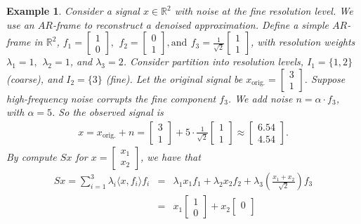 \documentclass[12pt,titlepage]{amsart}
\newtheorem{exam}[thm]{Example}
\theoremstyle{definition}
\theoremstyle{remark}
\begin{document}
\begin{exam} \label{exe.1}
Consider a signal $x \in \mathbb{R}^2$ with noise at the fine
resolution level. We use an $AR$-frame to reconstruct a denoised
approximation. Define a simple $AR$-frame in
$\mathbb{R}^2$, $f_1 = \begin{bmatrix}1 \\
0\end{bmatrix}, \,\ f_2 = \begin{bmatrix}0 \\ 1\end{bmatrix},
\mbox{and}\,\ f_3 = \frac{1}{\sqrt{2}} \begin{bmatrix}1 \\
1\end{bmatrix}$, with resolution weights $\lambda_1 = 1, \,\
\lambda_2 = 1$, and $\lambda_3 = 2$. Consider partition into
resolution levels, $I_1 = \{1, 2\}$ (coarse), and $I_2 = \{3\}$
(fine). Let the original signal be $x_{\text{orig.}} =
\begin{bmatrix}3 \\ 1\end{bmatrix}$. Suppose high-frequency noise
corrupts the fine component $f_3$. We add noise $n = \alpha \cdot
f_3$, with $\alpha = 5$. So the observed signal is
\begin{eqnarray*}
x = x_{\text{orig.}} + n = \begin{bmatrix}3 \\
1\end{bmatrix} + 5 \cdot \frac{1}{\sqrt{2}} \begin{bmatrix}1 \\
1\end{bmatrix} \approx \begin{bmatrix}6.54 \\
4.54\end{bmatrix}.
\end{eqnarray*}
By compute $Sx$ for $x =
\begin{bmatrix}x_1 \\ x_2\end{bmatrix}$, we have that
\begin{eqnarray*}
S x = \sum_{i=1}^3 \lambda_i \langle x,f_i\rangle f_i&=&\lambda_1
x_1 f_1 + \lambda_2 x_2 f_2 + \lambda_3 \left(
\frac{x_1 + x_2}{\sqrt{2}} \right) f_3\\
&=& x_1\begin{bmatrix}1 \\ 0\end{bmatrix} + x_2 \begin{bmatrix}0 \\

\end{bmatrix}
\end{eqnarray*}
\end{exam}
\end{document}
